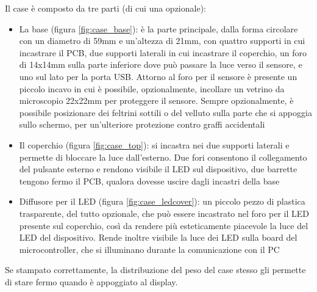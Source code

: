 Il case è composto da tre parti (di cui una opzionale):
\begin{itemize}
	\item La base (figura \ref{fig:case_base}): è la parte principale, dalla forma circolare con un diametro di 59mm e un'altezza di 21mm, con quattro supporti in cui incastrare il PCB, due supporti laterali in cui incastrare il coperchio, un foro di 14x14mm sulla parte inferiore dove può passare la luce verso il sensore, e uno sul lato per la porta USB. Attorno al foro per il sensore è presente un piccolo incavo in cui è possibile, opzionalmente, incollare un vetrino da microscopio 22x22mm per proteggere il sensore. Sempre opzionalmente, è possibile posizionare dei feltrini sottili o del velluto sulla parte che si appoggia sullo schermo, per un'ulteriore protezione contro graffi accidentali
	\item Il coperchio (figura \ref{fig:case_top}): si incastra nei due supporti laterali e permette di bloccare la luce dall'esterno. Due fori consentono il collegamento del pulsante esterno e rendono visibile il LED sul dispositivo, due barrette tengono fermo il PCB, qualora dovesse uscire dagli incastri della base
	\item Diffusore per il LED (figura \ref{fig:case_ledcover}): un piccolo pezzo di plastica trasparente, del tutto opzionale, che può essere incastrato nel foro per il LED presente sul coperchio, così da rendere più esteticamente piacevole la luce del LED del dispositivo. Rende inoltre visibile la luce dei LED sulla board del microcontroller, che si illuminano durante la comunicazione con il PC
\end{itemize}

Se stampato correttamente, la distribuzione del peso del case stesso gli permette di stare fermo quando è appoggiato al display.

